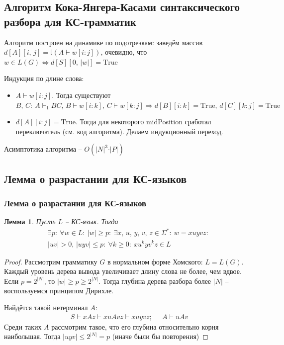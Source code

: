 \documentclass[a4paper,12pt]{article}
\renewcommand{\leq}{\ensuremath{\leqslant}}
\renewcommand{\geq}{\ensuremath{\geqslant}}
\theoremstyle{plain}
\newtheorem{lemma}{Лемма}[subsection]
\theoremstyle{definition}
\theoremstyle{remark}
\begin{document}
\subsection{Алгоритм Кока-Янгера-Касами синтаксического разбора для КС-грамматик}
Алгоритм построен на динамике по подотрезкам: заведём массив $d[A][i,\,j] = \mathbb{I}(A \vdash w[i : j])$, очевидно, что $w \in L(G) \Leftrightarrow d[S][0,\,\vert w \vert] = \text{True}$

Индукция по длине слова:
\begin{itemize}
	\item $A \vdash w[i : j]$. Тогда существуют $B,\, C:\: A \vdash_1 BC,\, B \vdash w[i : k],\, C \vdash w[k : j] \Rightarrow d[B][i : k] = \text{True},\, d[C][k : j] = \text{True}$
	\item $d[A][i:j] = \text{True}$. Тогда для некоторого midPosition сработал переключатель (см. код алгоритма). Делаем индукционный переход.
\end{itemize}

Асимптотика алгоритма -- $O(\vert N\vert^3\cdot \vert P\vert)$

\subsection{Лемма о разрастании для КС-языков}
\subsubsection*{Лемма о разрастании для КС-языков}
\begin{lemma}
	Пусть $L$ -- КС-язык. Тогда
	\begin{align*}
		\exists p :\: \forall w \in L :\: \vert w\vert \geq p :\: \exists x,\,u,\,y,\,v,\,z \in \Sigma^* :\: w = xuyvz :\: \\
		\vert uv\vert > 0,\, |uyv| \leq p :\: \forall k \geq 0 :\: xu^kyv^kz \in L
	\end{align*}
\end{lemma}

\begin{proof}
	Рассмотрим грамматику $G$ в нормальном форме Хомского: $L = L(G)$. Каждый уровень дерева вывода увеличивает длину слова не более, чем вдвое. Если $p = 2^{\vert N \vert}$, то $\vert w\vert \geq p \geq 2^{\vert N\vert}$. Тогда глубина дерева разбора более $\vert N\vert$ -- воспользуемся принципом Дирихле.

	Найдётся такой нетерминал $A$:
	\begin{align*}
		S \vdash xAz \vdash xuAvz \vdash xuyvz ;\;\;\;\;\; A \vdash uAv
	\end{align*}
	Среди таких $A$ рассмотрим такое, что его глубина относительно корня наибольшая. Тогда $|uyv| \leq 2^{\vert N\vert} = p$ (иначе были бы повторения)
\end{proof}
\end{document}
